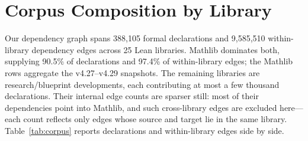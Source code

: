 \section{Corpus Composition by Library}
\label{app:corpus}

Our dependency graph spans 388{,}105 formal declarations and 9{,}585{,}510 within-library dependency edges across 25 Lean libraries. Mathlib dominates both, supplying 90.5\% of declarations and 97.4\% of within-library edges; the Mathlib rows aggregate the v4.27--v4.29 snapshots. The remaining libraries are research/blueprint developments, each contributing at most a few thousand declarations. Their internal edge counts are sparser still: most of their dependencies point into Mathlib, and such cross-library edges are excluded here---each count reflects only edges whose source and target lie in the same library. Table~\ref{tab:corpus} reports declarations and within-library edges side by side.

